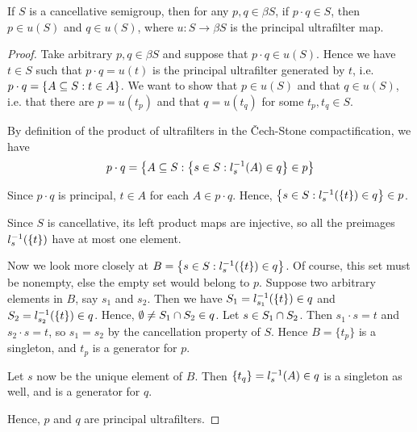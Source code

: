 \documentclass[11pt,letterpaper]{article}
\newcommand{\cechstone}{\v{C}ech-Stone}
\begin{document}
\begin{prop}
    If $S$ is a cancellative semigroup,
    then for any $p, q \in \beta S$,
    if $p \cdot q \in S$, then $p \in u(S)$ and $q \in u(S)$,
    where $u : S \to \beta S$ is the principal ultrafilter map.
\end{prop}

\begin{proof}
    Take arbitrary $p, q \in \beta S$ and suppose that $p \cdot q \in u(S)$.
    Hence we have $t \in S$ such that $p \cdot q = u(t)$ is the principal
    ultrafilter generated by $t$,
    i.e. $p \cdot q = \left\{A \subseteq S : t \in A\right\}$.
    We want to show that $p \in u(S)$ and that $q \in u(S)$,
    i.e. that there are $p = u(t_p)$ and that $q = u(t_q)$
    for some $t_p, t_q \in S$.

    By definition of the product of ultrafilters in the \cechstone{}
    compactification, we have
    \begin{equation*}
        p \cdot q = \left\{
            A \subseteq S :
            \left\{
                s \in S :
                l_s^{-1}(A) \in q
            \right\}
            \in p
        \right\}
    \end{equation*}

    Since $p \cdot q$ is principal, $t \in A$ for each $A \in p \cdot q$.
    Hence, $\left\{s \in S : l_s^{-1}(\{t\}) \in q\right\} \in p$.

    Since $S$ is cancellative, its left product maps are injective,
    so all the preimages $l_s^{-1}(\{t\})$ have at most one element.

    Now we look more closely at
    $B = \left\{s \in S : l_s^{-1}(\{t\}) \in q\right\}$.
    Of course, this set must be nonempty, else the empty set would belong to
    $p$.
    Suppose two arbitrary elements in $B$, say $s_1$ and $s_2$.
    Then we have $S_1 = l_{s_1}^{-1}(\{t\}) \in q$
    and $S_2 = l_{s_2}^{-1}(\{t\}) \in q$.
    Hence, $\emptyset \neq S_1 \cap S_2 \in q$.
    Let $s \in S_1 \cap S_2$. Then $s_1 \cdot s = t$ and $s_2 \cdot s = t$,
    so $s_1 = s_2$ by the cancellation property of $S$.
    Hence $B = \{t_p\}$ is a singleton, and $t_p$ is a generator for $p$.

    Let $s$ now be the unique element of $B$.
    Then $\{t_q\} = l_s^{-1}(A) \in q$ is a singleton as well,
    and is a generator for $q$.

    Hence, $p$ and $q$ are principal ultrafilters.
\end{proof}
\end{document}
